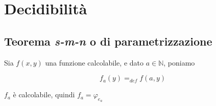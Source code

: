 \chapter{Decidibilità}
	
	\section{Teorema \textit{s-m-n }o di parametrizzazione}
	
	Sia $f(x,y)$ una funzione calcolabile, e dato $a \in \mathbb{N}$, poniamo 
	
	$$
	f_a(y) =_{def} f(a,y)
	$$
	
	$f_a$ è calcolabile, quindi $f_a = \varphi_{e_a}$
	